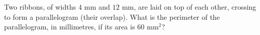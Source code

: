 Two ribbons, of widths $4$ mm and $12$ mm, are laid on top of each other, crossing to form a parallelogram (their overlap). What is the perimeter of the parallelogram, in millimetres, if its area is $60\text{ mm}^2$?
